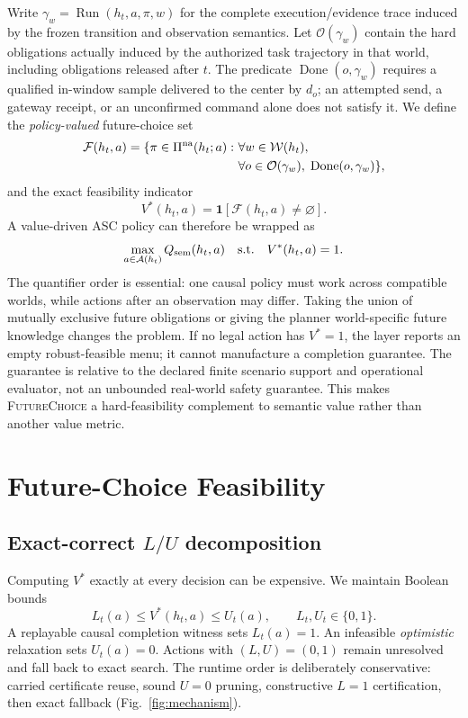 \documentclass[conference]{IEEEtran}
\newcommand{\futurechoice}{\textsc{FutureChoice}\xspace}
\newcommand{\Ob}{\mathcal{O}}
\newcommand{\Worlds}{\mathcal{W}}
\newcommand{\Choices}{\mathcal{F}}
\begin{document}
Write $\gamma_w=\operatorname{Run}(h_t,a,\pi,w)$ for the complete execution/evidence trace induced by the frozen transition and observation semantics. Let $\Ob(\gamma_w)$ contain the hard obligations actually induced by the authorized task trajectory in that world, including obligations released after $t$. The predicate $\operatorname{Done}(o,\gamma_w)$ requires a qualified in-window sample delivered to the center by $d_o$; an attempted send, a gateway receipt, or an unconfirmed command alone does not satisfy it. We define the \emph{policy-valued} future-choice set
\begin{equation}
\begin{aligned}
\Choices(h_t,a)=\{\pi\in\Pi^{\rm na}(h_t;a):\ &
\forall w\in\Worlds(h_t),\\
&\forall o\in\Ob(\gamma_w),\;
\operatorname{Done}(o,\gamma_w)\},
\end{aligned}
\end{equation}
and the exact feasibility indicator
\begin{equation}
V^*(h_t,a)=\mathbf 1[\Choices(h_t,a)\neq\varnothing].
\end{equation}
A value-driven ASC policy can therefore be wrapped as
\begin{equation}
\max_{a\in\mathcal A(h_t)} Q_{\rm sem}(h_t,a)
\quad \text{s.t.}\quad V^*(h_t,a)=1.
\end{equation}
The quantifier order is essential: one causal policy must work across compatible worlds, while actions after an observation may differ. Taking the union of mutually exclusive future obligations or giving the planner world-specific future knowledge changes the problem. If no legal action has $V^*=1$, the layer reports an empty robust-feasible menu; it cannot manufacture a completion guarantee. The guarantee is relative to the declared finite scenario support and operational evaluator, not an unbounded real-world safety guarantee. This makes \futurechoice a hard-feasibility complement to semantic value rather than another value metric.

\section{Future-Choice Feasibility}
\label{sec:method}
\subsection{Exact-correct $L/U$ decomposition}
Computing $V^*$ exactly at every decision can be expensive. We maintain Boolean bounds
\begin{equation}
L_t(a)\le V^*(h_t,a)\le U_t(a),\qquad L_t,U_t\in\{0,1\}.
\end{equation}
A replayable causal completion witness sets $L_t(a)=1$. An infeasible \emph{optimistic} relaxation sets $U_t(a)=0$. Actions with $(L,U)=(0,1)$ remain unresolved and fall back to exact search. The runtime order is deliberately conservative: carried certificate reuse, sound $U=0$ pruning, constructive $L=1$ certification, then exact fallback (Fig.~\ref{fig:mechanism}).
\end{document}
